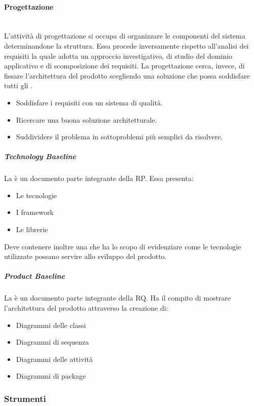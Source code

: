 \documentclass[../norme-di-progetto.tex]{subfiles}
\begin{document}
\paragraph{Progettazione}\mbox{}\\
\label{par:progettazione}
L'attività di progettazione si occupa di organizzare le componenti del sistema determinandone la struttura. Essa procede inversamente rispetto all'analisi dei requisiti la quale adotta un approccio investigativo, di studio del dominio applicativo e di scomposizione dei requisiti. La progettazione cerca, invece, di fissare l'architettura del prodotto scegliendo una soluzione che possa soddisfare tutti gli .
\begin{itemize}
	\item Soddisfare i requisiti con un sistema di qualità.
	\item Ricercare una buona soluzione architetturale.
	\item Suddividere il problema in sottoproblemi più semplici da risolvere.
\end{itemize}
\subparagraph{Technology Baseline}
\label{subp:technology baseline}
La  è un documento parte integrante della RP. Essa presenta:
\begin{itemize}
	\item Le tecnologie
	\item I framework
	\item Le librerie
\end{itemize}
Deve contenere inoltre una  che ha lo scopo di evidenziare come le tecnologie utilizzate possano servire allo sviluppo del prodotto.
\subparagraph{Product Baseline}
\label{subp:product baseline}
La  è un documento parte integrante della RQ. Ha il compito di mostrare l'architettura del prodotto attraverso la creazione di:
\begin{itemize}
	\item Diagrammi delle classi
	\item Diagrammi di sequenza
	\item Diagrammi delle attività
	\item Diagrammi di package
\end{itemize}
\subsubsection{Strumenti}
\label{subs:strumenti}
\end{document}

